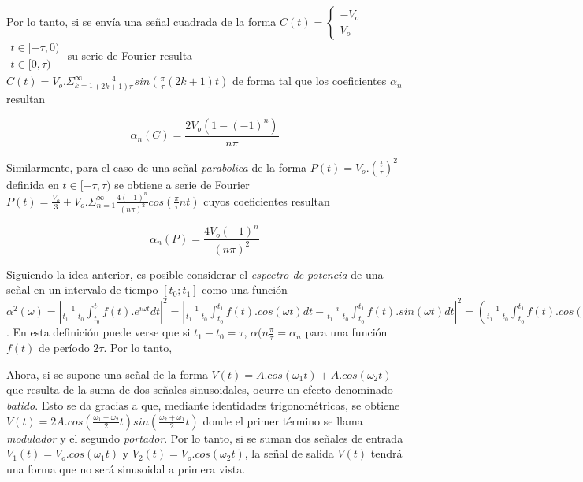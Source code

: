 \documentclass[11pt,a4paper]{article}
\begin{document}
Por lo tanto, si se envía una señal cuadrada de la forma $C(t)=
\left\{\begin{matrix}
-V_o \\ V_o
\end{matrix}\right.$
$\begin{matrix}
t\in[-\tau,0)\\ t\in[0,\tau)
\end{matrix}$
su serie de Fourier resulta $C(t) = V_o.\Sigma_{k=1}^{\infty} \frac{4}{(2k+1)\pi}sin(\frac{\pi}{\tau}(2k+1)t)$ de forma tal que los coeficientes $\alpha_n$ resultan

\begin{equation}
\alpha_n(C) = \frac{2V_o(1-(-1)^n)}{n\pi}
\label{eq:coef_cuad}
\end{equation}

Similarmente, para el caso de una señal \textit{parabolica} de la forma $P(t)=V_o.(\frac{t}{\tau})^2$ definida en $t\in[-\tau,\tau)$ se obtiene a serie de Fourier $P(t) = \frac{V_o}{3} + V_o.\Sigma_{n=1}^{\infty} \frac{4(-1)^n}{(n\pi)^2}cos(\frac{\pi}{\tau}nt)$ cuyos coeficientes resultan

\begin{equation}
\alpha_n(P) = \frac{4V_o(-1)^n}{(n\pi)^2}
\label{eq:coef_parab}
\end{equation}

Siguiendo la idea anterior, es posible considerar el \textit{espectro de potencia} de una señal en un intervalo de tiempo $[t_0;t_1]$ como una función $\alpha^2(\omega) = |\frac{1}{t_1-t_0}\int_{t_0}^{t_1} f(t).e^{i\omega t}dt|^2= |\frac{1}{t_1-t_0}\int_{t_0}^{t_1} f(t).cos(\omega t)dt - \frac{i}{t_1-t_0}\int_{t_0}^{t_1} f(t).sin(\omega t)dt|^2 = (\frac{1}{t_1-t_0}\int_{t_0}^{t_1} f(t).cos(\omega t)dt)^2+(\frac{1}{t_1-t_0}\int_{t_0}^{t_1} f(t).sin(\omega t)dt)^2$. En esta definición puede verse que si $t_1-t_0=\tau$, $\alpha(n\frac{\pi}{\tau} = \alpha_n$ para una función $f(t)$ de período $2\tau$. Por lo tanto, 

Ahora, si se supone una señal de la forma $V(t) = A.cos(\omega_1t) + A.cos(\omega_2t)$ que resulta de la suma de dos señales sinusoidales, ocurre un efecto denominado \textit{batido}. Esto se da gracias a que, mediante identidades trigonométricas, se obtiene $V(t) = 2A.cos(\frac{\omega_1-\omega_2}{2}t)sin(\frac{\omega_2+\omega_1}{2}t)$ donde el primer término se llama \textit{modulador} y el segundo \textit{portador}. Por lo tanto, si se suman dos señales de entrada 
$V_1(t) = V_o.cos(\omega_1t)$ y $V_2(t) = V_o.cos(\omega_2t)$, la señal de salida $V(t)$ tendrá una forma que no será sinusoidal a primera vista. 
\end{document}
